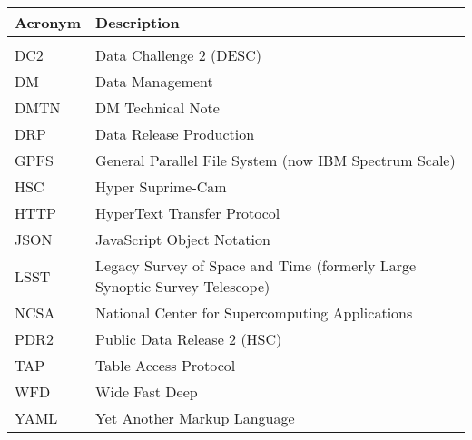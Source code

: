 \addtocounter{table}{-1}
\begin{longtable}{p{}p{}}\hline
\textbf{Acronym} & \textbf{Description}  \\\hline

 &  \\\hline
DC2 & Data Challenge 2 (DESC) \\\hline
DM & Data Management \\\hline
DMTN & DM Technical Note \\\hline
DRP & Data Release Production \\\hline
GPFS & General Parallel File System (now IBM Spectrum Scale) \\\hline
HSC & Hyper Suprime-Cam \\\hline
HTTP & HyperText Transfer Protocol \\\hline
JSON & JavaScript Object Notation \\\hline
LSST & Legacy Survey of Space and Time (formerly Large Synoptic Survey Telescope) \\\hline
NCSA & National Center for Supercomputing Applications \\\hline
PDR2 & Public Data Release 2 (HSC) \\\hline
TAP & Table Access Protocol \\\hline
WFD & Wide Fast Deep \\\hline
YAML & Yet Another Markup Language \\\hline
\end{longtable}
